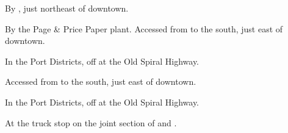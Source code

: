 
\begin{LocationList}

By , just northeast of downtown.

By the Page \& Price Paper plant. Accessed from  to the south, just east of downtown.

In the Port Districts, off  at the Old Spiral Highway.

Accessed from  to the south, just east of downtown.

In the Port Districts, off  at the Old Spiral Highway.

At the truck stop on the joint section of  and .

\end{LocationList}
